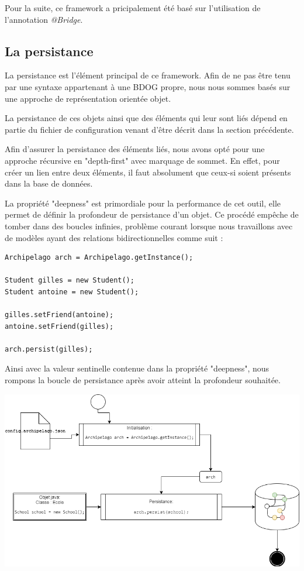 \documentclass[a4paper,fleqn,12pt]{report}
\begin{document}
Pour la suite, ce framework a pricipalement été basé sur l'utilisation de l'annotation \textit{@Bridge}.

\subsection{La persistance}


La persistance est l'élément principal de ce framework. Afin de ne pas être tenu par une syntaxe appartenant à une BDOG propre, nous nous sommes basés sur une approche de représentation orientée objet. 

La persistance de ces objets ainsi que des éléments qui leur sont liés  dépend en partie du fichier de configuration venant d'être décrit dans la section précédente. 

Afin d'assurer la persistance des éléments liés, nous avons opté pour une approche récursive en "depth-first" avec marquage de sommet. En effet, pour créer un lien entre deux éléments, il faut absolument que ceux-si soient présents dans la base de données.

La propriété "deepness" est primordiale pour la performance de cet outil, elle permet de définir la profondeur de persistance d'un objet. Ce procédé empêche de tomber dans des boucles infinies, problème courant lorsque nous travaillons avec de modèles ayant des relations bidirectionnelles comme suit : 

\begin{lstlisting}
Archipelago arch = Archipelago.getInstance();

Student gilles = new Student();
Student antoine = new Student();

gilles.setFriend(antoine);
antoine.setFriend(gilles);

arch.persist(gilles);
\end{lstlisting}

Ainsi avec la valeur sentinelle contenue dans la propriété "deepness", nous rompons la boucle de persistance après avoir atteint la profondeur souhaitée.

\begin{center}
\includegraphics[scale=0.5]{figures/Persist.png}
\label{fig:Persist}
\end{center}
    
\end{document}
